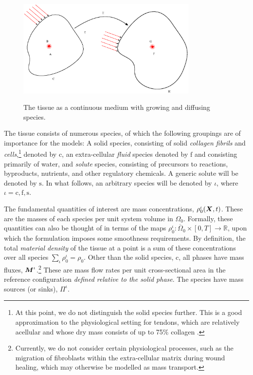 \begin{figure}
  \centering
	 {\includegraphics[width=0.8\textwidth]
           {images/elucidation/cp-mass-solute}}
	 \caption{The tissue as a continuous medium with growing and
           diffusing species.}
	 \label{continuum-potato-mass}
\end{figure}

The tissue consists of numerous species, of which the following
 groupings are of importance for the models: A solid species,
 consisting of solid \emph{collagen fibrils} and \emph{cells},\footnote{At this
 point, we do not distinguish the solid species further. This is a
 good approximation to the physiological setting for tendons, which
 are relatively acellular and whose dry mass consists of up to 75\%
 collagen \citep{Nordinetal:2001}.} denoted by $\mathrm{c}$, an
 extra-cellular \emph{fluid} species denoted by $\mathrm{f}$ and
 consisting primarily of water, and \emph{solute} species, consisting
 of precursors to reactions, byproducts, nutrients, and other
 regulatory chemicals. A generic solute will be denoted by
 $\mathrm{s}$. In what follows, an arbitrary species will be denoted
 by $\iota$, where $\iota = \mathrm{c,f,s}$.

The fundamental quantities of interest are mass concentrations,
$\rho_0^\iota(\mbox{\boldmath$ X$},t)$. These are the masses of each species per unit
system volume in $\Omega_0$. Formally, these quantities can also be
thought of in terms of the maps $\rho_0^\iota: \overline{\Omega}_0
\times [0,T] \rightarrow \mathbb{R}$, upon which the formulation
imposes some smoothness requirements. By definition, the total {\em
material density} of the tissue at a point is a sum of these
concentrations over all species $\sum\limits_{\iota}\rho_0^\iota =
\rho_0$. Other than the solid species, $\mathrm{c}$, all phases have
mass fluxes, $\mbox{\boldmath$ M$}^\iota$.\footnote{Currently, we do not consider
  certain physiological 
processes, such as the migration of fibroblasts within the
extra-cellular matrix during wound healing, which may otherwise be
modelled as mass transport.} These are mass flow rates per unit
cross-sectional area in the reference configuration \emph{defined
relative to the solid phase}. The species have mass sources (or
sinks), $\Pi^\iota$.

